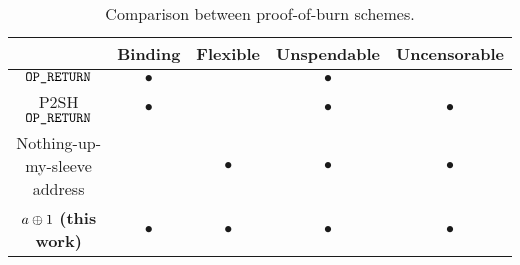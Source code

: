 \begin{table}[h!]
    \newcommand{\y}{$\bullet$}
    \newcommand{\n}{}
    \centering
    \caption{Comparison between proof-of-burn schemes.\label{table:comparison}}

    \begin{tabular}{ |c|c|c|c|c| }
     \hline
                                        & Binding & Flexible & Unspendable & Uncensorable \\
     \hline
     $\texttt{OP\_RETURN}$                         & \y      & \n       & \y          & \n \\
     P2SH $\texttt{OP\_RETURN}$                    & \y      & \n       & \y          & \y \\
     Nothing-up-my-sleeve address       & \n      & \y       & \y          & \y \\
     $a \oplus 1$ \textbf{(this work)}    & \y      & \y       & \y          & \y \\
     \hline
    \end{tabular}
\end{table}
